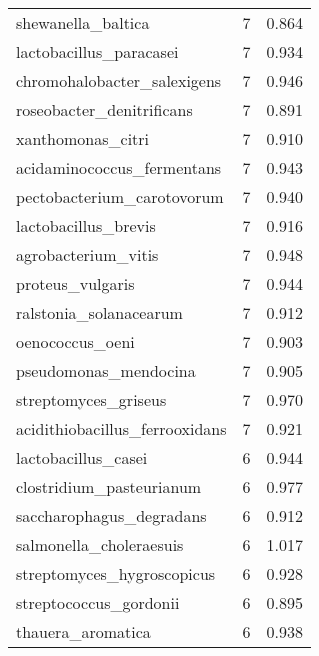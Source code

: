 \begin{tabular}{lrr}
                          shewanella\_baltica &                   7 &     0.864 \\
                     lactobacillus\_paracasei &                   7 &     0.934 \\
                 chromohalobacter\_salexigens &                   7 &     0.946 \\
                   roseobacter\_denitrificans &                   7 &     0.891 \\
                           xanthomonas\_citri &                   7 &     0.910 \\
                  acidaminococcus\_fermentans &                   7 &     0.943 \\
                  pectobacterium\_carotovorum &                   7 &     0.940 \\
                        lactobacillus\_brevis &                   7 &     0.916 \\
                         agrobacterium\_vitis &                   7 &     0.948 \\
                            proteus\_vulgaris &                   7 &     0.944 \\
                      ralstonia\_solanacearum &                   7 &     0.912 \\
                             oenococcus\_oeni &                   7 &     0.903 \\
                       pseudomonas\_mendocina &                   7 &     0.905 \\
                        streptomyces\_griseus &                   7 &     0.970 \\
              acidithiobacillus\_ferrooxidans &                   7 &     0.921 \\
                         lactobacillus\_casei &                   6 &     0.944 \\
                    clostridium\_pasteurianum &                   6 &     0.977 \\
                    saccharophagus\_degradans &                   6 &     0.912 \\
                     salmonella\_choleraesuis &                   6 &     1.017 \\
                  streptomyces\_hygroscopicus &                   6 &     0.928 \\
                      streptococcus\_gordonii &                   6 &     0.895 \\
                           thauera\_aromatica &                   6 &     0.938 \\

\end{tabular}
